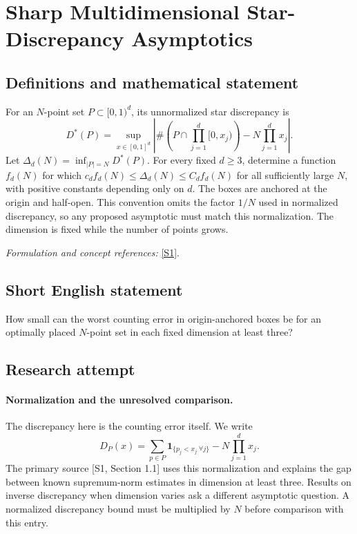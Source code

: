 \documentclass[11pt]{article}
\begin{document}
\section*{\texorpdfstring{Sharp Multidimensional Star-Discrepancy Asymptotics}{Sharp Multidimensional Star-Discrepancy Asymptotics}}\label{statement}
\subsection{Definitions and mathematical statement}
For an $N$-point set $P\subset[0,1)^d$, its unnormalized star discrepancy is
\[
 D^*(P)=\sup_{x\in[0,1]^d}
 \left|\#\left(P\cap\prod_{j=1}^d[0,x_j)\right)-N\prod_{j=1}^dx_j\right|.
\]
Let $\Delta_d(N)=\inf_{|P|=N}D^*(P)$. For every fixed $d\ge3$, determine a function $f_d(N)$ for which $c_df_d(N)\le\Delta_d(N)\le C_df_d(N)$ for all sufficiently large $N$, with positive constants depending only on $d$. The boxes are anchored at the origin and half-open. This convention omits the factor $1/N$ used in normalized discrepancy, so any proposed asymptotic must match this normalization. The dimension is fixed while the number of points grows.
\par\smallskip\textit{Formulation and concept references:} \href{https://www-users.cse.umn.edu/~dbilyk/bilyk-research.pdf}{[S1]}.

\subsection{Short English statement}
How small can the worst counting error in origin-anchored boxes be for an optimally placed $N$-point set in each fixed dimension at least three?
\subsection{Research attempt}
\paragraph{Normalization and the unresolved comparison.}
The discrepancy here is the counting error itself. We write
\[
 D_P(x)=\sum_{p\in P}\mathbf1_{\{p_j<x_j\ \forall j\}}
                         -N\prod_{j=1}^dx_j.
\]
The primary source [S1, Section 1.1] uses this normalization and
explains the gap between known supremum-norm estimates in dimension
at least three. Results on inverse discrepancy when dimension varies
ask a different asymptotic question. A normalized discrepancy bound
must be multiplied by $N$ before comparison with this entry.
\end{document}
